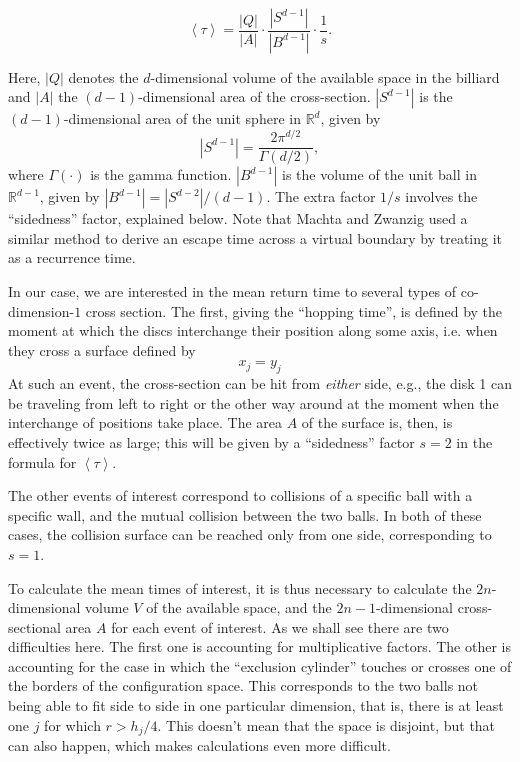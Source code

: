 \documentclass[superscriptaddress,pre,reprint,showpacs,twocolumn]{revtex4-1}
\newcommand{\mean}[1]{\left \langle #1 \right \rangle}
\newcommand{\RR}{\mathbb{R}}
\begin{document}
\begin{equation}\label{meanfreetime}
 \mean{\tau} = \frac{|Q|}{|A|} \cdot \frac{|S^{d-1}|} {|B^{d-1}|} \cdot \frac{1}{s}.
\end{equation}


Here, $|Q|$ denotes the $d$-dimensional volume of the available 
space in the billiard and 
$|A|$ the $(d-1)$-dimensional area of the cross-section.
 $|S^{d-1}|$ is the $(d-1)$-dimensional area of the unit sphere in $\RR^d$, given by
\begin{equation}
  |S^{d-1}| = \frac{2 \pi^{d/2}}{\Gamma(d/2)},
\end{equation}
where $\Gamma(\cdot)$ is the gamma function. 
$|B^{d-1}|$ is the volume of the unit ball 
in $\RR^{d-1}$, given by $|B^{d-1}| = |S^{d-2}| / (d-1)$.
The extra factor $1/s$ involves the ``sidedness'' factor, explained below.
Note that Machta and Zwanzig \cite{MachtaZwan} used a similar method to derive an escape 
time across a virtual boundary by treating it as a recurrence time.


In our case, we are interested in the mean return time to 
several types of co-dimension-$1$ cross section.
The first, giving the ``hopping time'', 
is defined by the moment
at which the discs interchange their position along some axis, i.e.
when they cross a surface defined by
\begin{equation} \label{condhop}
x_j = y_j 
\end{equation}
At such an event, the cross-section can be hit from \emph{either} side,
e.g., the disk 1 can be traveling from left to right or the other way around
at the moment when the interchange of positions take place. 
The area $A$ of the surface is, then, 
 is effectively twice as large; this will be given by a ``sidedness'' factor $s=2$ in the formula
for $\mean{\tau}$.

The other events of interest correspond to collisions of a specific
ball with a specific wall, and the mutual collision between the two balls.
In both of these cases, the collision surface can be reached only from one side, corresponding to $s = 1$.

To calculate the mean times of interest, it is thus necessary to calculate
the $2n$-dimensional volume $V$ of the available space, and the $2n-1$-dimensional cross-sectional area $A$ 
for each event of interest. As we shall see there are two difficulties here.
The first one is accounting for multiplicative factors. The other is accounting for
the case in which the ``exclusion cylinder'' touches or crosses one of the borders of
the configuration space. This corresponds to the two balls not being able to fit
side to side in one particular dimension, that is, there is at least one $j$ for
which $r>h_j/4$. This doesn't mean that the space is disjoint, but that can also
happen, which makes calculations even more difficult.
\end{document}
